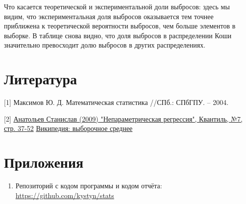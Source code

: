 Что касается теоретической и экспериментальной доли выбросов: здесь мы видим, что экспериментальная доля выбросов оказывается тем точнее приближена к теоретической вероятности выбросов, чем больше элементов в выборке. В таблице снова видно, что доля выбросов в распределении Коши значительно превосходит долю выбросов в других распределениях.

\section{Литература}
[1] Максимов Ю. Д. Математическая статистика //СПб.: СПбГПУ. – 2004.

[2]
\href{http://quantile.ru/07/07-SA.pdf}{Анатольев Станислав (2009) "Непараметрическая регрессия", Квантиль, №7, стр. 37-52} \href{https://ru.wikipedia.org/wiki/%D0%92%D1%8B%D0%B1%D0%BE%D1%80%D0%BE%D1%87%D0%BD%D0%BE%D0%B5_%D1%81%D1%80%D0%B5%D0%B4%D0%BD%D0%B5%D0%B5}{Википедия: выборочное среднее}

\section{Приложения}

\begin{enumerate}
	\item Репозиторий с кодом программы и кодом отчёта: \href{https://github.com/kystyn/stats}{https://github.com/kystyn/stats}
\end{enumerate}


